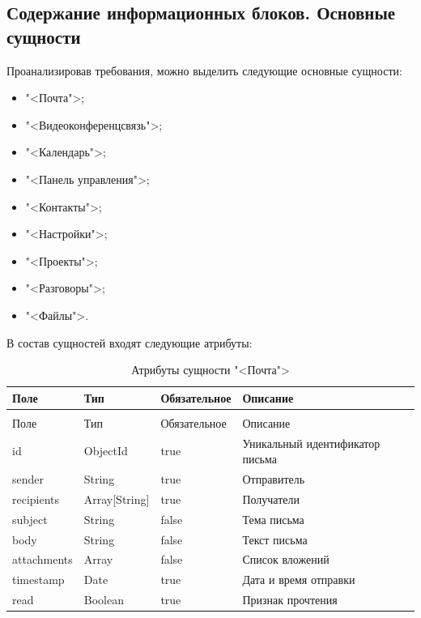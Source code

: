 \subsection{Содержание информационных блоков. Основные сущности}

Проанализировав требования, можно выделить следующие основные сущности:
\begin{itemize}
  \item "<Почта">;
  \item "<Видеоконференцсвязь">;
  \item "<Календарь">;
  \item "<Панель управления">;
  \item "<Контакты">;
  \item "<Настройки">;
  \item "<Проекты">;
  \item "<Разговоры">;
  \item "<Файлы">.
\end{itemize}

В состав сущностей входят следующие атрибуты:

\begin{xltabular}{\textwidth}{|l|l|p{3.2cm}|X|}
  \caption{Атрибуты сущности "<Почта">\label{mail:table}}\\ \hline
  Поле & Тип & Обязательное & Описание \\ \hline
  \endfirsthead
  \\ \hline
  Поле & Тип & Обязательное & Описание \\ \hline
  \endhead
  id & ObjectId & true & Уникальный идентификатор письма \\ \hline
  sender & String & true & Отправитель \\ \hline
  recipients & Array[String] & true & Получатели \\ \hline
  subject & String & false & Тема письма \\ \hline
  body & String & false & Текст письма \\ \hline
  attachments & Array & false & Список вложений \\ \hline
  timestamp & Date & true & Дата и время отправки \\ \hline
  read & Boolean & true & Признак прочтения \\ \hline
\end{xltabular}

